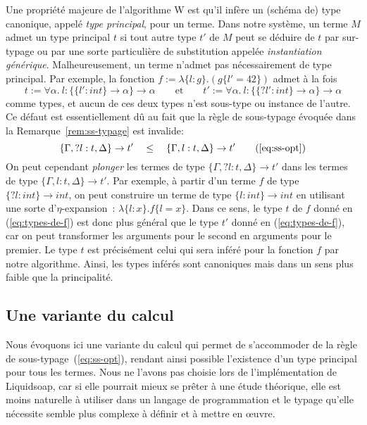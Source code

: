 \documentclass[twoside]{article}
\newcommand{\liquidsoap}{Liquidsoap}
\newcommand{\univ}[2]{\forall #1.~ #2}
\newcommand{\mabs}[2]{\lambda\{#1\}.#2}
\newcommand{\tmabs}[2]{\{#1\}\to #2}
\newcommand{\mapp}[2]{#1\{#2\}}
\newcommand{\eqdef}{:=}
\theoremstyle{plain}
\theoremstyle{definition}
\theoremstyle{remark}
\begin{document}
Une propriété majeure de l'algorithme W est
qu'il infère un (schéma de) type canonique,
appelé \emph{type principal}, pour un terme. Dans notre système, un terme $M$
admet un type principal $t$ si tout autre type $t'$ de $M$ peut se déduire de
$t$ par sur-typage ou par une sorte particulière de substitution appelée
\emph{instantiation générique}. Malheureusement, un terme n'admet pas
nécessairement de type principal. Par exemple, la fonction
$f\eqdef\lambda\{l:g\}.(g\{l'=42\})$ admet à la fois
\begin{equation}
\label{eq:types-de-f}
t\eqdef\univ{\alpha}{l:\{\{l':int\}\rightarrow\alpha\}\rightarrow\alpha}
\qquad\text{et}\qquad
t'\eqdef\univ{\alpha}{l:\{\{?l':int\}\rightarrow\alpha\}\rightarrow\alpha}
\end{equation}
comme types, et aucun de ces deux types n'est sous-type ou instance de
l'autre. Ce défaut est essentiellement dû au fait que la règle de sous-typage
évoquée dans la Remarque~\ref{rem:ss-typage} est invalide:
\begin{equation*}
\tmabs{\Gamma,?l:t,\Delta}t'\quad\leq\quad\tmabs{\Gamma,l:t,\Delta}t'
\tag{\ref{eq:ss-opt}}
\end{equation*}
On peut cependant \emph{plonger} les termes de
type $\tmabs{\Gamma,?l:t,\Delta}{t'}$ dans les termes de type
$\tmabs{\Gamma,l:t,\Delta}{t'}$.
Par exemple, à partir d'un terme $f$ de type $\tmabs{?l:int}{int}$,
on peut construire
un terme de type $\tmabs{l:int}{int}$ en utilisant une sorte
d'$\eta$-expansion~: $\mabs{l:x}{\mapp{f}{l=x}}$.
Dans ce sens, le type $t$ de $f$ donné en (\ref{eq:types-de-f}) est
donc plus général que le type $t'$ donné en (\ref{eq:types-de-f}),
car on peut transformer les arguments pour le
second en arguments pour le premier. Le type $t$ est précisément celui qui sera
inféré pour la fonction $f$ par notre algorithme. Ainsi, les types inférés sont
canoniques mais dans un sens plus faible que la principalité.

\subsection{Une variante du calcul}
Nous évoquons ici une variante du calcul qui permet de s'accommoder de la règle
de sous-typage~(\ref{eq:ss-opt}), rendant ainsi possible l'existence d'un type
principal pour tous les termes. Nous ne l'avons pas choisie lors de
l'implémentation de \liquidsoap{}, car si elle pourrait mieux se prêter à une
étude théorique, elle est moins naturelle à utiliser dans un langage
de programmation et le typage qu'elle nécessite semble plus complexe
à définir et à mettre en \oe{}uvre.
\end{document}
